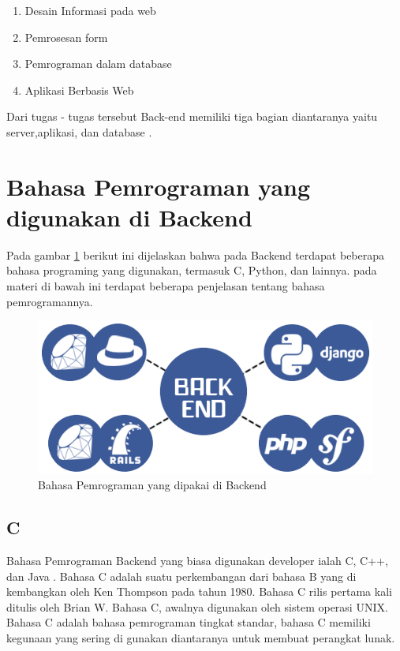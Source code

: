\begin{enumerate}
\item Desain Informasi pada web
\item Pemrosesan form
\item Pemrograman dalam database
\item Aplikasi Berbasis Web
\end{enumerate}
Dari tugas - tugas tersebut Back-end memiliki tiga bagian diantaranya yaitu server,aplikasi, dan database
\cite{shapiro2005system}.

\section{Bahasa Pemrograman yang digunakan di Backend}
Pada gambar \ref{2labelgambar} berikut ini dijelaskan bahwa pada Backend terdapat beberapa bahasa programing yang digunakan,
termasuk C, Python, dan lainnya. pada materi di bawah ini terdapat beberapa penjelasan tentang bahasa pemrogramannya.

\begin{figure}[h]
\centerline{\includegraphics[width=1\textwidth]{figures/1bahasapemrogramanbackend.png}}
\caption{Bahasa Pemrograman yang dipakai di Backend}
\label{2labelgambar}
\end{figure}

\subsection{C}
	Bahasa Pemrograman Backend yang biasa digunakan developer ialah C, C++, dan Java .
Bahasa C adalah suatu perkembangan dari bahasa B yang di kembangkan oleh Ken Thompson pada tahun 1980.
Bahasa C rilis pertama kali ditulis oleh Brian W. Bahasa C, awalnya digunakan oleh sistem operasi UNIX.
Bahasa C adalah bahasa pemrograman tingkat standar, bahasa C memiliki kegunaan yang sering di gunakan
diantaranya untuk membuat perangkat lunak.

